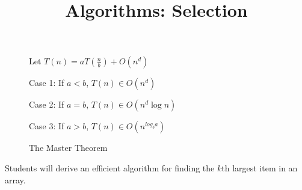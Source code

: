 \documentclass{tufte-handout}
\title{Algorithms: Selection}
\date{}
\begin{document}
\maketitle

\begin{figure}
\caption{The Master Theorem}
Let $T(n) = a T(\frac{n}{b}) + O(n^d)$ 

Case 1: If $a < b$, $T(n) \in O(n^d)$

Case 2: If $a = b$, $T(n) \in O(n^d \log n)$

Case 3: If $a > b$, $T(n) \in O(n^{log_b a})$
\end{figure}

\begin{objective}
  Students will derive an efficient algorithm for finding the $k$th largest item in an array.
\end{objective}
\end{document}
